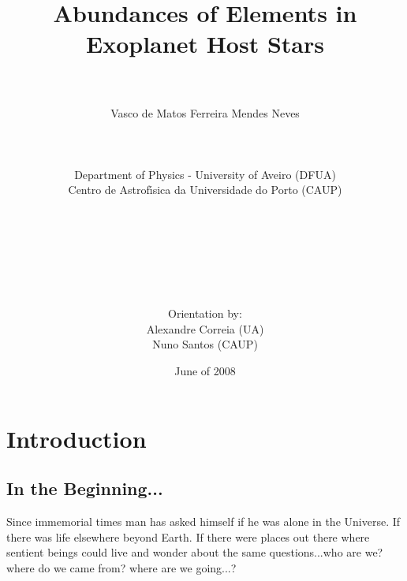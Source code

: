 \documentclass[dvips,12pt,a4paper]{report}
\title{Abundances of Elements in Exoplanet Host Stars}
\author{\\
\\
Vasco de Matos Ferreira Mendes Neves \\ [4mm]
\\
\\
\\
Department of Physics - University of Aveiro (DFUA) \\
Centro de Astrof\'{\i}sica da Universidade do Porto (CAUP) \\
\\
\\
\\
\\
\\
\\
\\
Orientation by:\\
Alexandre Correia (UA) \\ Nuno Santos (CAUP)}
\date{June of 2008}
\begin{document}
\newpage
{}
\tableofcontents
\newpage
{}


\chapter{Introduction}
\cfoot{ { \thepage} }
\pagestyle{fancy}
\section{In the Beginning...}

Since immemorial times man has asked himself if he was alone in the Universe. If there was life elsewhere beyond Earth. If there were places out there where sentient beings could live and wonder about the same questions...who are we? where do we came from? where are we going...?
\end{document}
